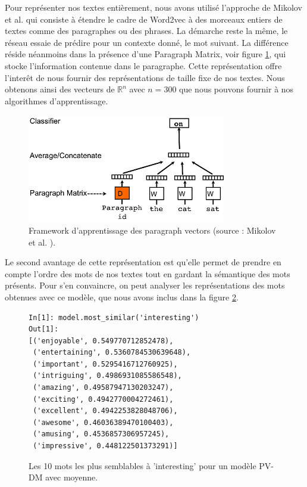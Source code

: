 \documentclass{article}
\begin{document}
Pour représenter nos textes entièrement, nous avons utilisé l'approche de Mikolov et al. \cite{le2014distributed} qui consiste à étendre le cadre de Word2vec à des morceaux entiers de textes comme des paragraphes ou des phrases. La démarche reste la même, le réseau essaie de prédire pour un contexte donné, le mot suivant. La différence réside néanmoins dans la présence d'une Paragraph Matrix, voir figure \ref{paragraph_vectors}, qui stocke l'information contenue dans le paragraphe.	
Cette représentation offre l'interêt de nous fournir des représentations de taille fixe de nos textes. Nous obtenons ainsi des vecteurs de $\mathbb{R}^n$ avec $n=300$ que nous pouvons fournir à nos algorithmes d'apprentissage.
\begin{figure}[h]
\begin{center}
\includegraphics{images/paragraph_vectors.png}
\caption{Framework d'apprentissage des paragraph vectors (source : Mikolov et al. \cite{le2014distributed}).}
\label{paragraph_vectors}
\end{center}
\end{figure}

Le second avantage de cette représentation est qu'elle permet de prendre en compte l'ordre des mots de nos textes tout en gardant la sémantique des mots présents. Pour s'en convaincre, on peut analyser les représentations des mots obtenues avec ce modèle, que nous avons inclus dans la figure \ref{similarities}.
\begin{figure}[h]
\begin{verbatim}
In[1]: model.most_similar('interesting')
Out[1]:
[('enjoyable', 0.549770712852478),
 ('entertaining', 0.5360784530639648),
 ('important', 0.5295416712760925),
 ('intriguing', 0.4986931085586548),
 ('amazing', 0.49587947130203247),
 ('exciting', 0.4942770004272461),
 ('excellent', 0.4942253828048706),
 ('awesome', 0.46036389470100403),
 ('amusing', 0.4536857306957245),
 ('impressive', 0.448122501373291)]

\end{verbatim}
\caption{Les 10 mots les plus semblables à 'interesting' pour un modèle PV-DM avec moyenne.}
\label{similarities}
\end{figure}
\end{document}
